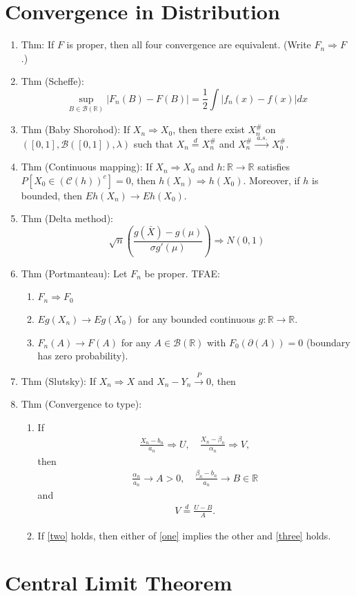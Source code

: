 \documentclass{article}
\newcommand{\as}{\;a.s.\;}
\newcommand{\pto}{\overset{P}{\to}}
\newcommand{\asto}{\overset{\as}{\to}}
\newcommand{\dto}{\Rightarrow}
\newcommand{\deq}{\overset{d}{=}}
\newcommand{\R}{\mathbb{R}}
\newcommand{\C}{\mathcal{C}}
\newcommand{\B}{\mathcal{B}}
\begin{document}
\section{Convergence in Distribution}
\begin{enumerate}
\item Thm: If $F$ is proper, then all four convergence are
  equivalent. (Write $F_n \Rightarrow F$.)
\item Thm (Scheffe):
  \[
    \sup_{B \in \B(\R)} |F_n(B) - F(B)| = \frac{1}{2} \int |f_n(x) -
    f(x)| dx
  \]
\item Thm (Baby Shorohod): If $X_n \Rightarrow X_0$, then there exist
  $X_n^\#$ on $([0,1], \B([0,1]), \lambda)$ such that
  $X_n \deq X_n^\#$ and $X_n^\# \asto X_0^\#$.
\item Thm (Continuous mapping): If $X_n \Rightarrow X_0$ and
  $h: \R \to \R$ satisfies $P[X_0 \in (\C(h))^c] = 0$, then
  $h(X_n) \Rightarrow h(X_0)$. Moreover, if $h$ is bounded, then
  $Eh(X_n)\to Eh(X_0)$.
\item Thm (Delta method):
  \[
    \sqrt{n} \left(\frac{g(\bar{X}) - g(\mu)}{\sigma g'(\mu)} \right)
    \Rightarrow N(0,1)
  \]
\item Thm (Portmanteau): Let $F_n$ be proper. TFAE:
  \begin{enumerate}
  \item $F_n \Rightarrow F_0$
  \item $Eg(X_n) \to Eg(X_0)$ for any bounded continuous
    $g: \R \to \R$.
  \item $F_n(A) \to F(A)$ for any $A \in \B(\R)$ with
    $F_0(\partial(A)) = 0$ (boundary has zero probability).
  \end{enumerate}
\item Thm (Slutsky): If $X_n \dto X$ and $X_n - Y_n \pto 0$, then
\item Thm (Convergence to type):
  \begin{enumerate}
  \item If
    \begin{align}\label{one}
      \frac{X_n - b_n}{a_n} \dto U, \quad \frac{X_n -
      \beta_n}{\alpha_n} \dto V,
    \end{align}
    then
    \begin{align}\label{two}
      \frac{\alpha_n}{a_n} \to A > 0, \quad \frac{\beta_n - b_n}{a_n}
      \to B \in \R
    \end{align}
    and
    \begin{align}\label{three}
      V \deq \frac{U-B}{A}.
    \end{align}
  \item If \cref{two} holds, then either of \cref{one} implies the
    other and \cref{three} holds.
  \end{enumerate}
\end{enumerate}

\section{Central Limit Theorem}
\end{document}

